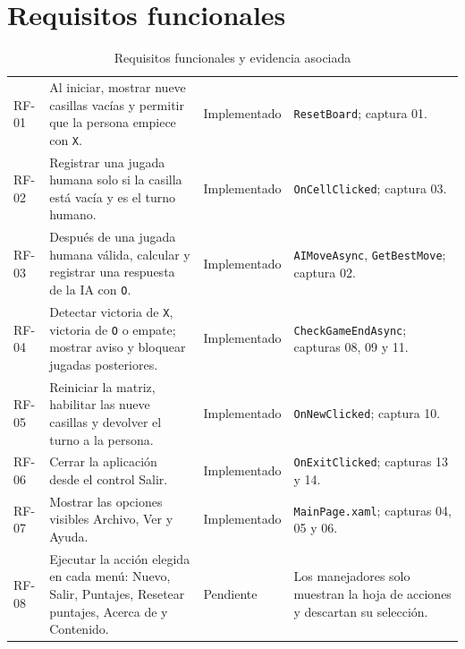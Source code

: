 \section{Requisitos funcionales}
\begin{table}[H]
\centering
\small
\caption{Requisitos funcionales y evidencia asociada}\label{tab:rf}
\begin{tabular}{P{1.0cm}P{7.5cm}P{2.7cm}P{3.0cm}}
\toprule
{} &  &  & \\
\midrule
RF-01 & Al iniciar, mostrar nueve casillas vacías y permitir que la persona empiece con \texttt{X}. & Implementado & \texttt{ResetBoard}; captura 01.\\
RF-02 & Registrar una jugada humana solo si la casilla está vacía y es el turno humano. & Implementado & \texttt{OnCellClicked}; captura 03.\\
RF-03 & Después de una jugada humana válida, calcular y registrar una respuesta de la IA con \texttt{O}. & Implementado & \texttt{AIMove\allowbreak Async}, \texttt{GetBest\allowbreak Move}; captura 02.\\
RF-04 & Detectar victoria de \texttt{X}, victoria de \texttt{O} o empate; mostrar aviso y bloquear jugadas posteriores. & Implementado & \texttt{CheckGameEnd\allowbreak Async}; capturas 08, 09 y 11.\\
RF-05 & Reiniciar la matriz, habilitar las nueve casillas y devolver el turno a la persona. & Implementado & \texttt{OnNewClicked}; captura 10.\\
RF-06 & Cerrar la aplicación desde el control Salir. & Implementado & \texttt{OnExitClicked}; capturas 13 y 14.\\
RF-07 & Mostrar las opciones visibles Archivo, Ver y Ayuda. & Implementado & \texttt{MainPage.xaml}; capturas 04, 05 y 06.\\
RF-08 & Ejecutar la acción elegida en cada menú: Nuevo, Salir, Puntajes, Resetear puntajes, Acerca de y Contenido. & Pendiente & Los manejadores solo muestran la hoja de acciones y descartan su selección.\\
\bottomrule
\end{tabular}
\end{table}

